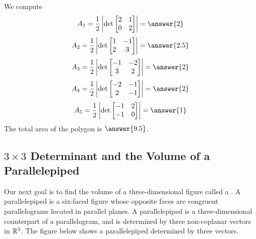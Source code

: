 \documentclass{ximera}
\begin{document}
\begin{example}
\begin{explanation}
\begin{center}
    \end{center}
    We compute
    $$A_1=\frac{1}{2}\left|\det\begin{bmatrix}2 & 1\\0 & 2\end{bmatrix}\right |=\answer{2}$$
    $$A_2=\frac{1}{2}\left|\det\begin{bmatrix}1 & -1\\2 & 3\end{bmatrix}\right |=\answer{2.5}$$
    $$A_3=\frac{1}{2}\left|\det\begin{bmatrix}-1 & -2\\3 & 2\end{bmatrix}\right |=\answer{2}$$
    $$A_4=\frac{1}{2}\left|\det\begin{bmatrix}-2 & -1\\2 & -1\end{bmatrix}\right |=\answer{2}$$
    $$A_5=\frac{1}{2}\left|\det\begin{bmatrix}-1 & 2\\-1 & 0\end{bmatrix}\right |=\answer{1}$$
    The total area of the polygon is $\answer{9.5}$.
    \end{explanation}
    \end{example}
     
     
    \subsection*{$3\times 3$ Determinant and the Volume of a Parallelepiped}
     
    Our next goal is to find the volume of a three-dimensional figure called a .  A parallelepiped is a six-faced figure whose opposite faces are congruent parallelograms located in parallel planes.  A parallelepiped is a three-dimensional counterpart of a parallelogram, and is determined by three non-coplanar vectors in $\mathbb{R}^3$.  The figure below shows a parallelepiped determined by three vectors.
     
\end{document}
